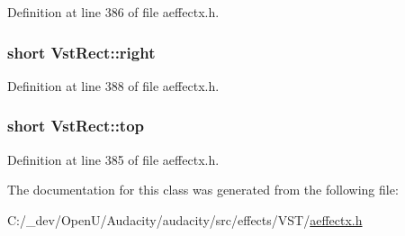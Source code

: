 Definition at line 386 of file aeffectx.\+h.

\subsubsection[{\texorpdfstring{right}{right}}]{\setlength{\rightskip}{0pt plus 5cm}short Vst\+Rect\+::right}\hypertarget{class_vst_rect_a134a7aa919791f2ffaad850853e0751d}{}\label{class_vst_rect_a134a7aa919791f2ffaad850853e0751d}


Definition at line 388 of file aeffectx.\+h.

\subsubsection[{\texorpdfstring{top}{top}}]{\setlength{\rightskip}{0pt plus 5cm}short Vst\+Rect\+::top}\hypertarget{class_vst_rect_a7f8eed550cd4a163997947b9840e6c69}{}\label{class_vst_rect_a7f8eed550cd4a163997947b9840e6c69}


Definition at line 385 of file aeffectx.\+h.



The documentation for this class was generated from the following file\+:\begin{DoxyCompactItemize}
\item 
C\+:/\+\_\+dev/\+Open\+U/\+Audacity/audacity/src/effects/\+V\+S\+T/\hyperlink{aeffectx_8h}{aeffectx.\+h}\end{DoxyCompactItemize}
